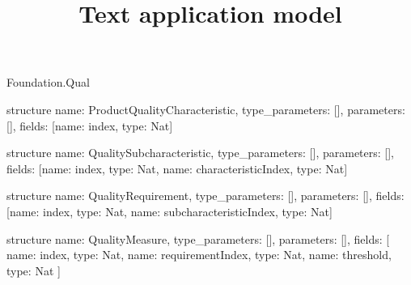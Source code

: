 \begin{lexlean}{Foundation.Qual}
\title{Text application model}
\begin{semanticmodule}
structure{
  name: ProductQualityCharacteristic,
  type_parameters: [],
  parameters: [],
  fields: [{name: index, type: Nat}]
}

structure{
  name: QualitySubcharacteristic,
  type_parameters: [],
  parameters: [],
  fields: [{name: index, type: Nat}, {name: characteristicIndex, type: Nat}]
}

structure{
  name: QualityRequirement,
  type_parameters: [],
  parameters: [],
  fields: [{name: index, type: Nat}, {name: subcharacteristicIndex, type: Nat}]
}

structure{
  name: QualityMeasure,
  type_parameters: [],
  parameters: [],
  fields: [
    {name: index, type: Nat},
    {name: requirementIndex, type: Nat},
    {name: threshold, type: Nat}
  ]
}
\end{semanticmodule}
\end{lexlean}
